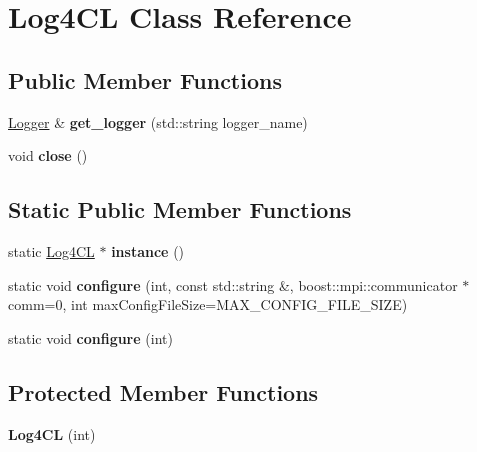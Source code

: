 \hypertarget{class_log4_c_l}{\section{Log4\-C\-L Class Reference}
\label{class_log4_c_l}
}
\subsection*{Public Member Functions}
\begin{DoxyCompactItemize}
\item 
\hypertarget{class_log4_c_l_acf274891399834114393e5440e54d78e}{\hyperlink{class_logger}{Logger} \& {\bfseries get\-\_\-logger} (std\-::string logger\-\_\-name)}\label{class_log4_c_l_acf274891399834114393e5440e54d78e}

\item 
\hypertarget{class_log4_c_l_a79dd02857dbcee7b00431e8508390910}{void {\bfseries close} ()}\label{class_log4_c_l_a79dd02857dbcee7b00431e8508390910}

\end{DoxyCompactItemize}
\subsection*{Static Public Member Functions}
\begin{DoxyCompactItemize}
\item 
\hypertarget{class_log4_c_l_a3657ff59071abde1631607884a04f366}{static \hyperlink{class_log4_c_l}{Log4\-C\-L} $\ast$ {\bfseries instance} ()}\label{class_log4_c_l_a3657ff59071abde1631607884a04f366}

\item 
\hypertarget{class_log4_c_l_aba1953ed8d7bc7c38ccea87c510b952c}{static void {\bfseries configure} (int, const std\-::string \&, boost\-::mpi\-::communicator $\ast$comm=0, int max\-Config\-File\-Size=M\-A\-X\-\_\-\-C\-O\-N\-F\-I\-G\-\_\-\-F\-I\-L\-E\-\_\-\-S\-I\-Z\-E)}\label{class_log4_c_l_aba1953ed8d7bc7c38ccea87c510b952c}

\item 
\hypertarget{class_log4_c_l_a3ccf6dcd6d42d3ad49e60cbbce2b57a3}{static void {\bfseries configure} (int)}\label{class_log4_c_l_a3ccf6dcd6d42d3ad49e60cbbce2b57a3}

\end{DoxyCompactItemize}
\subsection*{Protected Member Functions}
\begin{DoxyCompactItemize}
\item 
\hypertarget{class_log4_c_l_ab502e31e01c50cc11dc30cb400471561}{{\bfseries Log4\-C\-L} (int)}\label{class_log4_c_l_ab502e31e01c50cc11dc30cb400471561}

\end{DoxyCompactItemize}
